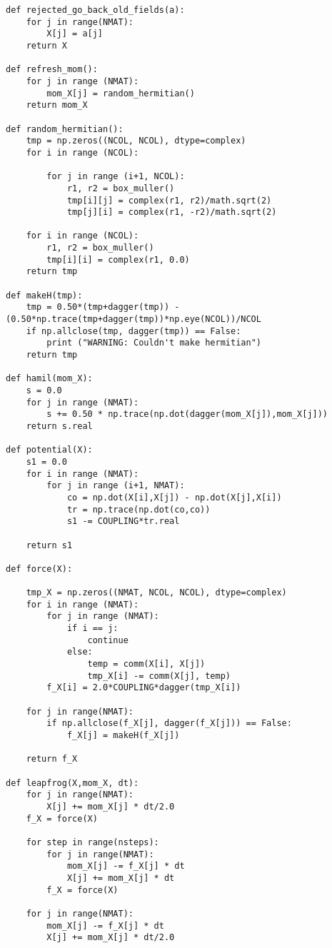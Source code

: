 \begin{lstlisting}
def rejected_go_back_old_fields(a):
    for j in range(NMAT):
        X[j] = a[j]
    return X

def refresh_mom():
    for j in range (NMAT):
        mom_X[j] = random_hermitian()
    return mom_X

def random_hermitian():
    tmp = np.zeros((NCOL, NCOL), dtype=complex)
    for i in range (NCOL):

        for j in range (i+1, NCOL):
            r1, r2 = box_muller()
            tmp[i][j] = complex(r1, r2)/math.sqrt(2)
            tmp[j][i] = complex(r1, -r2)/math.sqrt(2)

    for i in range (NCOL):
        r1, r2 = box_muller()
        tmp[i][i] = complex(r1, 0.0)
    return tmp 

def makeH(tmp):
    tmp = 0.50*(tmp+dagger(tmp)) - (0.50*np.trace(tmp+dagger(tmp))*np.eye(NCOL))/NCOL
    if np.allclose(tmp, dagger(tmp)) == False:
        print ("WARNING: Couldn't make hermitian")
    return tmp

def hamil(mom_X):
    s = 0.0 
    for j in range (NMAT):
        s += 0.50 * np.trace(np.dot(dagger(mom_X[j]),mom_X[j]))
    return s.real    

def potential(X):
    s1 = 0.0 
    for i in range (NMAT):
        for j in range (i+1, NMAT): 
            co = np.dot(X[i],X[j]) - np.dot(X[j],X[i])
            tr = np.trace(np.dot(co,co))
            s1 -= COUPLING*tr.real 

    return s1

def force(X):

    tmp_X = np.zeros((NMAT, NCOL, NCOL), dtype=complex)
    for i in range (NMAT): 
        for j in range (NMAT):
            if i == j:
                continue 
            else:
                temp = comm(X[i], X[j])
                tmp_X[i] -= comm(X[j], temp)
        f_X[i] = 2.0*COUPLING*dagger(tmp_X[i])

    for j in range(NMAT):
        if np.allclose(f_X[j], dagger(f_X[j])) == False:
            f_X[j] = makeH(f_X[j])

    return f_X  

def leapfrog(X,mom_X, dt):
    for j in range(NMAT):
        X[j] += mom_X[j] * dt/2.0
    f_X = force(X)

    for step in range(nsteps):
        for j in range(NMAT):
            mom_X[j] -= f_X[j] * dt
            X[j] += mom_X[j] * dt
        f_X = force(X)

    for j in range(NMAT):
        mom_X[j] -= f_X[j] * dt
        X[j] += mom_X[j] * dt/2.0
    

\end{lstlisting}
